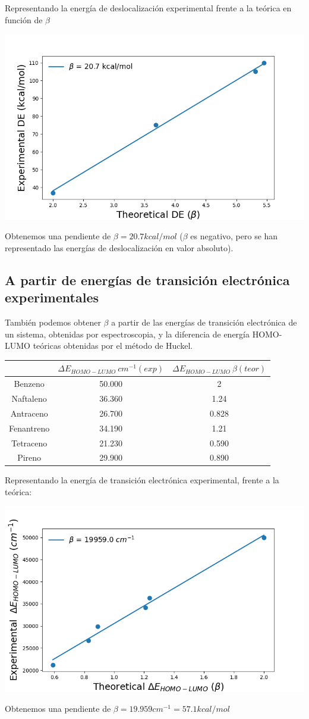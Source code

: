 \documentclass[12pt]{article}
\begin{document}
Representando la energía de deslocalización experimental frente a la teórica en función de $\beta$
\begin{center}
    \includegraphics[height=0.37\textwidth]{beta1_plt.png}
\end{center}
Obtenemos una pendiente de $\beta=20.7kcal/mol$ ($\beta$ es negativo, pero se han representado las energías de deslocalización en valor absoluto).




\subsection{A partir de energías de transición electrónica experimentales}
También podemos obtener $\beta$ a partir de las energías de transición electrónica de un sistema, obtenidas por espectroscopia, y la diferencia de energía HOMO-LUMO teóricas obtenidas por el método de Huckel.
\begin{center}
    \begin{tabular}{|c|c|c|}
\hline
 & $\Delta E_{HOMO-LUMO}\ cm^{-1} (exp)$ & $\Delta E_{HOMO-LUMO}\ \beta (teor)$ \\
\hline
Benzeno    & 50.000  & 2     \\
Naftaleno  & 36.360  & 1.24  \\
Antraceno  & 26.700  & 0.828 \\
Fenantreno & 34.190  & 1.21  \\
Tetraceno  & 21.230  & 0.590 \\
Pireno     & 29.900  & 0.890 \\
\hline
\end{tabular}
\end{center}

Representando la energía de transición electrónica experimental, frente a la teórica:
\begin{center}
    \includegraphics[height=0.37\textwidth]{beta2_plt.png}
\end{center}
Obtenemos una pendiente de $\beta=19.959cm^{-1}=57.1kcal/mol$
\end{document}
